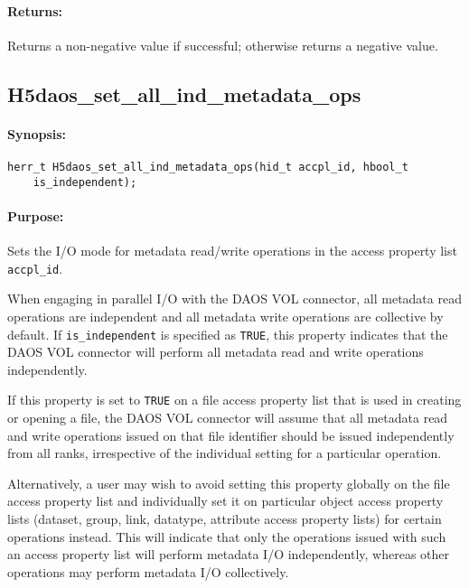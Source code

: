 \documentclass[../users_guide.tex]{subfiles}
\begin{document}
\paragraph{Returns:}
\begin{flushleft}%
Returns a non-negative value if successful; otherwise returns a negative value.
\end{flushleft}%

\newpage
\subsection{H5daos\_set\_all\_ind\_metadata\_ops}
\label{ref:h5daos_set_all_ind_metadata_ops}

\paragraph{Synopsis:}
\begin{flushleft}%
\begin{verbatim}
herr_t H5daos_set_all_ind_metadata_ops(hid_t accpl_id, hbool_t
    is_independent);
\end{verbatim}
\end{flushleft}%

\paragraph{Purpose:}
\begin{flushleft}%
Sets the I/O mode for metadata read/write operations in the access property list \texttt{accpl\_id}.

When engaging in parallel I/O with the DAOS VOL connector, all metadata read operations are
independent and all metadata write operations are collective by default. If \texttt{is\_independent} is
specified as \texttt{TRUE}, this property indicates that the DAOS VOL connector will perform all metadata
read and write operations independently.

If this property is set to \texttt{TRUE} on a file access property list that is used in creating or opening
a file, the DAOS VOL connector will assume that all metadata read and write operations issued on that file
identifier should be issued independently from all ranks, irrespective of the individual setting for a
particular operation.

Alternatively, a user may wish to avoid setting this property globally on the file access property list
and individually set it on particular object access property lists (dataset, group, link, datatype, attribute
access property lists) for certain operations instead. This will indicate that only the operations issued
with such an access property list will perform metadata I/O independently, whereas other operations may
perform metadata I/O collectively.  

\end{flushleft}%
\end{document}
